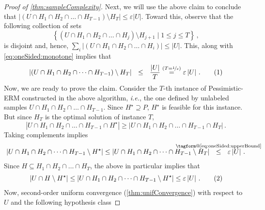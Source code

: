 \documentclass[11pt]{article}
\makeatletter
\theoremstyle{plain}
\theoremstyle{definition}
\theoremstyle{remark}
\newcommand{\yesnum}{\addtocounter{equation}{1}\tag{\theequation}}
\renewcommand{\eqref}[1]{\textup{\eqrefform@{\ref{#1}}}}
\let\eqrefform@\tagform@
\newcommand{\Stackrel}[2]{\stackrel{\mathmakebox[\widthof{\ensuremath{#2}}]{#1}}{#2}}
\def\abs#1{\left| #1 \right|}
\newcommand{\inbrace}[1]{\left\{#1\right\}}
\newcommand{\nfrac}[2]{\nicefrac{#1}{#2}}
\newcommand{\eps}{\varepsilon}
\newcommand{\ie}{\textit{i.e.}}
\newcommand{\pERM}{Pessimistic-ERM}
\newcommand{\optset}{{H^\star}}
\makeatother
\begin{document}
\begin{proof}[Proof of \cref{thm:sampleComplexity}]
            Next, we will use the above claim to conclude that $\abs{
                    (U\cap H_1\cap H_2\cap \dots \cap H_{T-1})
                    \setminus H_{T}
                }
                \leq \eps\abs{U}$.
            Toward this, observe that the following collection of sets
            \[
                \inbrace{(U\cap H_1\cap H_2\cap \dots \cap H_{j})
                    \setminus H_{j+1} \mid 1\leq j\leq T}\,,
            \]
            is disjoint and, hence, $\sum_i \abs{(U\cap H_1\cap H_2\cap \dots \cap H_{i})}\leq \abs{U}$.
            This, along with \cref{eq:oneSided:monotone} implies that 
            \[
                \abs{
                    (U\cap H_1\cap H_2\cap \dots \cap H_{T-1})
                    \setminus H_{T}
                }
                ~~\leq~~ \frac{\abs{U}}{T}
                ~~~\Stackrel{(T=\nfrac{1}{\eps})}{=}~~~ \eps\abs{U}\,.
                \yesnum\label{eq:oneSided:upperBound}
            \]
            \noindent Now, we are ready to prove the claim.
                    Consider the $T$-th instance of \pERM{} constructed in the above algorithm, \ie{}, the one defined by unlabeled samples $U\cap H_1\cap H_2\cap \dots \cap H_{T-1}$.
                    Since $\optset\supseteq P$, $\optset$ is feasible for this instance.
                    But since $H_{T}$ is the optimal solution of instance {$T$},
                    \[
                        \abs{U\cap H_1\cap H_2\cap \dots \cap H_{T-1} \cap \optset}
                        \geq 
                        \abs{U\cap H_1\cap H_2\cap \dots \cap H_{T-1} \cap H_{T}}\,.
                    \]
                    Taking complements implies 
                    \[
                        \abs{U\cap H_1\cap H_2\cap \dots \cap H_{T-1} \setminus \optset}
                        \leq 
                        \abs{U\cap H_1\cap H_2\cap \dots \cap H_{T-1} \setminus H_{T}}
                        ~~\Stackrel{\eqref{eq:oneSided:upperBound}}{\leq}~~ 
                            \eps \abs{U}\,.
                    \]
                    Since $H\subseteq H_1\cap H_2\cap \dots \cap H_{T}$, the above in particular implies that
                    \[
                        \abs{U\cap H \setminus \optset}
                        \leq 
                        \abs{U\cap H_1\cap H_2\cap \dots \cap H_{T-1} \setminus \optset}
                        \leq \eps\abs{U}\,.
    \yesnum\label{eq:oneSided:empiricalUB}
                    \]
                    Now, second-order uniform convergence (\cref{thm:unifConvergence}) with respect to $U$ and the following hypothesis class 

\end{proof}
\end{document}

